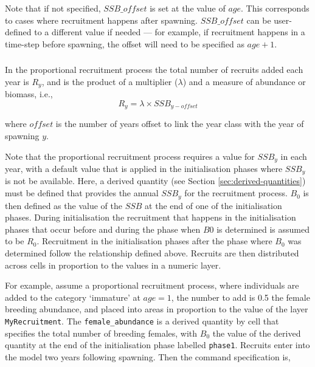 Note that if not specified, $SSB\_offset$ is set at the value of $age$. This corresponds to cases where recruitment happens after spawning. $SSB\_offset$ can be user-defined to a different value if needed --- for example, if recruitment happens in a time-step before spawning, the offset will need to be specified as $age + 1$.

\subsubsection*{}

In the proportional recruitment process the total number of recruits added each year is $R_y$, and is the product of a multiplier ($\lambda$) and a measure of abundance or biomass, i.e.,
\begin{equation}
  R_y = \lambda \times SSB_{y-offset}
\end{equation}
  
where $offset$ is the number of years offset to link the year class with the year of spawning $y$.

Note that the proportional recruitment process requires a value for $SSB_y$ in each year, with a default value that is applied in the initialisation phases where $SSB_y$ is not be available. Here, a derived quantity (see Section \ref{sec:derived-quantities}) must be defined that provides the annual $SSB_y$ for the recruitment process. $B_0$ is then defined as the value of the $SSB$ at the end of one of the initialisation phases. During initialisation the recruitment that happens in the initialisation phases that occur before and during the phase when $B0$ is determined is assumed to be $R_0$. Recruitment in the initialisation phases after the phase where $B_0$ was determined follow the relationship defined above. Recruits are then distributed across cells in proportion to the values in a numeric layer. 

For example, assume a proportional recruitment process, where individuals are added to the category `immature' at $age=1$, the number to add is 0.5 the female breeding abundance, and placed into areas in proportion to the value of the layer \texttt{MyRecruitment}. The \texttt{female\_abundance} is a derived quantity by cell that specifies the total number of breeding females, with $B_0$ the value of the derived quantity at the end of the initialisation phase labelled \texttt{phase1}. Recruits enter into the model two years following spawning. Then the command specification is,

